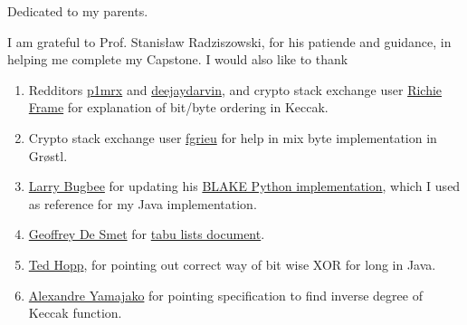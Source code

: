 \documentclass[12pt,american]{report}
\theoremstyle{plain}
\theoremstyle{definition}
\begin{document}
\beforepreface%

\vfill
\begin{center}
Dedicated to my parents.
\end{center}
\vfill

%
\vfill
I am grateful to Prof. Stanis{\l}aw Radziszowski, for his patiende and guidance, in helping me
complete my Capstone. \newline \newline
I would also like to thank 
\begin{enumerate}
\item Redditors \href{"http://www.reddit.com/user/p1mrx"}{p1mrx} and 
\href{"http://www.reddit.com/user/deejaydarvin"}{deejaydarvin}, and crypto stack exchange user 
\href{"http://crypto.stackexchange.com/users/8050/richie-frame"}{Richie Frame} for explanation of bit/byte 
ordering in Keccak.
\item Crypto stack exchange user \href{"http://crypto.stackexchange.com/users/555/fgrieu"}{fgrieu} for help
in mix byte implementation in Gr{\o}stl.
\item \href{"http://www.seanet.com/~bugbee"}{Larry Bugbee} for updating his 
\href{http://www.seanet.com/~bugbee/crypto/blake/}{BLAKE Python implementation}, which I used as reference 
for my Java implementation.
\item \href{"http://stackoverflow.com/users/472109/geoffrey-de-smet"}{Geoffrey De Smet} for 
\href{"http://docs.jboss.org/drools/release/latest/optaplanner-docs/html\_single/index.html\#tabuSearch"}
{tabu lists document}.
\item \href{"http://stackoverflow.com/users/535871/ted-hopp"}{Ted Hopp}, for pointing out correct way
of bit wise XOR for long in Java.
\item \href{"http://crypto.stackexchange.com/users/4136/alexandre-yamajako"}{Alexandre Yamajako} for pointing
specification to find inverse degree of Keccak function.
\end{enumerate}
\vfill
\end{document}

